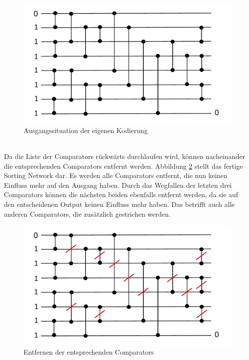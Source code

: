 \documentclass[a4,abstract=on]{scrartcl}
\begin{document}
\begin{figure}[H]
\centering
\includegraphics[width=\textwidth]{own_sorting_start.pdf}
\caption{Ausgangssituation der eigenen Kodierung}
\label{fig:ownSorting}
\end{figure}
\ \\
Da die Liste der Comparators rückwärts durchlaufen wird, können nacheinander die entsprechenden Comparators entfernt werden. Abbildung \ref{fig:ownSorting1} stellt das fertige Sorting Network dar. Es werden alle Comparators entfernt, die nun keinen Einfluss mehr auf den Ausgang haben. Durch das Wegfallen der letzten drei Comparators können die nächsten beiden ebenfalls entfernt werden, da sie auf den entscheidenen Output keinen Einfluss mehr haben. Das betrifft auch alle anderen Comparators, die zusätzlich gestrichen werden. 

\begin{figure}[H]
\centering
\includegraphics[width=\textwidth]{ownSorting_2.pdf}
\caption{Entfernen der entsprechenden Comparators}
\label{fig:ownSorting1}
\end{figure}
\end{document}
